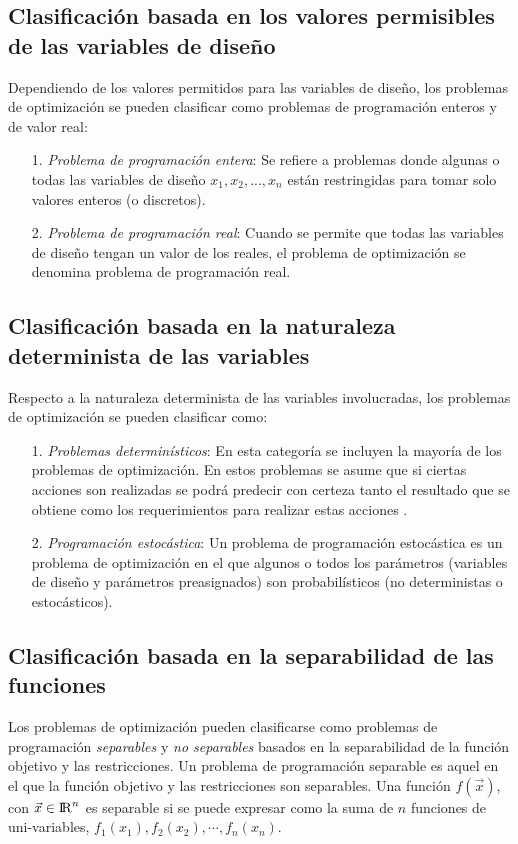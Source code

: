 \subsection{Clasificación basada en los valores permisibles de las variables de diseño}
Dependiendo de los valores permitidos para las variables de diseño, los problemas de optimización se pueden clasificar como problemas de programación enteros y de valor real:
\begin{itemize}
\item[1.] \textit{Problema de programación entera}: Se refiere a problemas donde algunas o todas las variables de diseño $x_1, x_2, ..., x_n$ están restringidas para tomar solo valores enteros (o discretos).
\item[2.] \textit{Problema de programación real}: Cuando se permite que todas las variables de diseño tengan un valor de los reales, el problema de optimización se denomina problema de programación real.

\end{itemize}
\subsection{Clasificación basada en la naturaleza determinista de las variables}
Respecto a la naturaleza determinista de las variables involucradas, los problemas de optimización se pueden clasificar como:
\begin{itemize}
\item [1.]\textit{Problemas determinísticos}: En esta categoría se incluyen la mayoría de los problemas de optimización. En estos problemas se asume que si ciertas acciones son realizadas se podrá predecir con certeza tanto el resultado que se obtiene como los requerimientos para realizar estas acciones \cite{dantzig_linear_2016}.
\item[2.] \textit{Programación estocástica}:
Un problema de programación estocástica es un problema de optimización en el que algunos o todos los parámetros (variables de diseño y parámetros preasignados) son probabilísticos (no deterministas o estocásticos).

\end{itemize}
 
\subsection{Clasificación basada en la separabilidad de las funciones} 
Los problemas de optimización pueden clasificarse como problemas de programación \textit{separables} y\textit{ no separables} basados en la separabilidad de la función objetivo y las restricciones. Un problema de programación separable es aquel en el que la función objetivo y las restricciones son separables. Una función $f(\vec{x})$, con $\vec{x} \in {\rm I\!R}^{n}$ es separable si se puede expresar como la suma de $n$ funciones de uni-variables, $ f_1(x_1), f_2 (x_2), \cdots, f_n (x_n)$.

